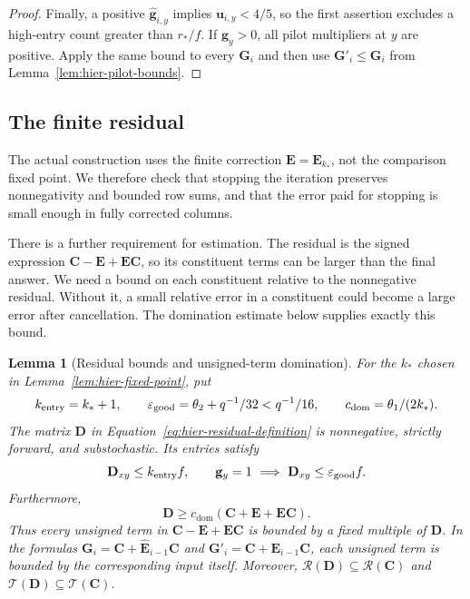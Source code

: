 \documentclass[11pt]{article}
\numberwithin{equation}{section}
\newtheorem{lemma}[theorem]{Lemma}
\theoremstyle{definition}
\theoremstyle{remark}
\begin{document}
\begin{proof}
Finally, a positive $\widehat {\mathbf{g}}_{i,y}$ implies ${\mathbf{u}}_{i,y}<4/5$, so the
first assertion excludes a high-entry count greater than ${r}_*/f$.
If ${\mathbf{g}}_{y}>0$, all pilot multipliers at $y$ are positive.  Apply the
same bound to every ${\mathbf{G}}_i$ and then use ${\mathbf{G}}'_i\leq {\mathbf{G}}_i$ from
Lemma~\ref{lem:hier-pilot-bounds}.
\end{proof}

\subsection{The finite residual}

The actual construction uses the finite correction ${\mathbf{E}}={\mathbf{E}}_{k_*}$, not the comparison fixed point. We therefore check that stopping the iteration preserves nonnegativity and bounded row sums, and that the error paid for stopping is small enough in fully corrected columns.

There is a further requirement for estimation. The residual is the signed expression ${\mathbf{C}}-{\mathbf{E}}+{\mathbf{E}}{\mathbf{C}}$, so its constituent terms can be larger than the final answer. We need a bound on each constituent relative to the nonnegative residual. Without it, a small relative error in a constituent could become a large error after cancellation. The domination estimate below supplies exactly this bound.

\begin{lemma}[Residual bounds and unsigned-term domination]
\label{lem:hier-residual}
For the $k_*$ chosen in Lemma~\ref{lem:hier-fixed-point}, put
\[
 {k_{\rm entry}}=k_*+1,\qquad
 \varepsilon_{\mathrm{good}}=\theta_2+q^{-1}/32<q^{-1}/16,
 \qquad c_{\mathrm{dom}}=\theta_1/(2k_*).
\]
The matrix ${\mathbf{D}}$ in Equation~\eqref{eq:hier-residual-definition} is
nonnegative, strictly forward, and substochastic.  Its entries satisfy
\begin{equation}
 {\mathbf{D}}_{xy}\leq {k_{\rm entry}}f,
 \qquad
 {\mathbf{g}}_{y}=1\ \Longrightarrow\ {\mathbf{D}}_{xy}\leq\varepsilon_{\mathrm{good}}f.
 \label{eq:hier-residual-entry-bounds}
\end{equation}
Furthermore,
\begin{equation}
 {\mathbf{D}}\geq c_{\mathrm{dom}}({\mathbf{C}}+{\mathbf{E}}+{\mathbf{E}}{\mathbf{C}}).
 \label{eq:hier-domination}
\end{equation}
Thus every unsigned term in ${\mathbf{C}}-{\mathbf{E}}+{\mathbf{E}}{\mathbf{C}}$ is bounded by a fixed multiple
of ${\mathbf{D}}$.  In the formulas ${\mathbf{G}}_i={\mathbf{C}}+\widehat {\mathbf{E}}_{i-1}{\mathbf{C}}$ and
${\mathbf{G}}'_i={\mathbf{C}}+{\mathbf{E}}_{i-1}{\mathbf{C}}$, each unsigned term is bounded by the corresponding
input itself.  Moreover,
$\mathcal R({\mathbf{D}})\subseteq\mathcal R({\mathbf{C}})$ and
$\mathcal T({\mathbf{D}})\subseteq\mathcal T({\mathbf{C}})$.
\end{lemma}
\end{document}
